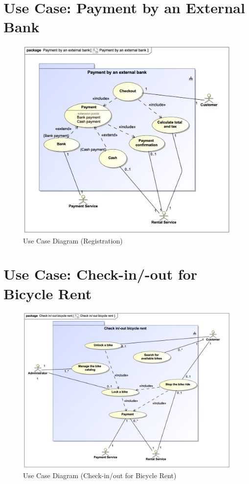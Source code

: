 \documentclass[a4paper, 12pt]{article}
\begin{document}
\section{Use Case: Payment by an External Bank}
\begin{figure}[H]
\begin{center}
\includegraphics[scale=0.5]{02-e-bike-rental-service-variant-1-02.png}
\end{center}
\caption{Use Case Diagram (Registration)}
\end{figure}

\section{Use Case: Check-in/-out for Bicycle Rent}
\begin{figure}[H]
\begin{center}
\includegraphics[scale=0.5]{02-e-bike-rental-service-variant-1-03.png}
\end{center}
\caption{Use Case Diagram (Check-in/out for Bicycle Rent)}
\end{figure}
\end{document}
